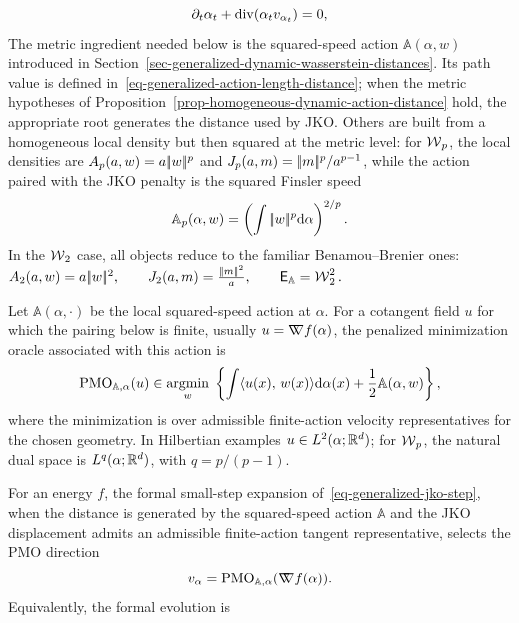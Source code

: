 \begin{equation}\label{eq-generalized-flow-continuity-motivation}
\partial_t\alpha_t+\operatorname{div}(\alpha_t v_{\alpha_t})=0,
\end{equation}
The metric ingredient needed below is the squared-speed action $\mathbb A(\alpha,w)$ introduced in Section~\ref{sec-generalized-dynamic-wasserstein-distances}. Its path value is defined in~\eqref{eq-generalized-action-length-distance}; when the metric hypotheses of Proposition~\ref{prop-homogeneous-dynamic-action-distance} hold, the appropriate root generates the distance used by JKO. Others are built from a homogeneous local density but then squared at the metric level: for $\operatorname{\mathcal{W}}_p$, the local densities are \(A_p(a,w)=a|\!| w |\!|^p\) and \(J_p(a,m)=|\!| m |\!|^p/a^{p-1}\), while the action paired with the JKO penalty is the squared Finsler speed
\[
\mathbb A_p(\alpha,w)=\left(\int|\!| w |\!|^p\mathrm{d}\alpha\right)^{2/p}.
\]
In the \(\operatorname{\mathcal{W}}_2\) case, all objects reduce to the familiar Benamou--Brenier ones: \(A_2(a,w)=a|\!| w |\!|^2, \qquad J_2(a,m)=\frac{|\!| m |\!|^2}{a}, \qquad \mathsf E_{\mathbb A}=\operatorname{\mathcal{W}}_2^2.\)
\begin{defn}\label{def-generalized-action-steepest-direction}
Let \(\mathbb A(\alpha,\cdot)\) be the local squared-speed action at \(\alpha\). For a cotangent field \(u\) for which the pairing below is finite, usually \(u=\mathord{\nabla\mkern-9.3mu\nabla} f(\alpha)\), the penalized minimization oracle associated with this action is
\begin{equation}\label{eq-local-action-steepest-descent}
\operatorname{PMO}_{\mathbb A,\alpha}(u)
\in
\underset{w}{\operatorname{argmin}}\;
\left\{
\int \langle u(x),\,w(x)\rangle\mathrm{d}\alpha(x)
+
\frac12\mathbb A(\alpha,w)
\right\},
\end{equation}
where the minimization is over admissible finite-action velocity representatives for the chosen geometry. In Hilbertian examples \(u\in L^2(\alpha;\mathbb{R}^d)\); for \(\operatorname{\mathcal{W}}_p\), the natural dual space is \(L^q(\alpha;\mathbb{R}^d)\), with \(q=p/(p-1)\).
\end{defn}
For an energy $f$, the formal small-step expansion of~\eqref{eq-generalized-jko-step}, when the distance is generated by the squared-speed action \(\mathbb A\) and the JKO displacement admits an admissible finite-action tangent representative, selects the PMO direction
\begin{equation}\label{eq-generalized-gradient-from-action}
v_{\alpha}
=
\operatorname{PMO}_{\mathbb A,\alpha}(\mathord{\nabla\mkern-9.3mu\nabla} f(\alpha)).
\end{equation}
Equivalently, the formal evolution is
